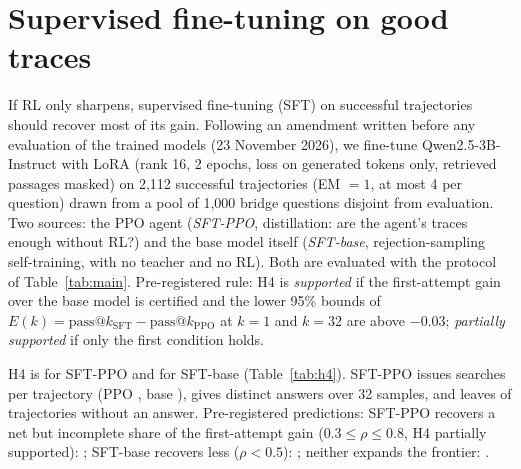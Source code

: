 \documentclass[11pt]{article}
\makeatletter
\newcommand{\passk}{\mathrm{pass@}k}
\makeatother
\begin{document}
\section{Supervised fine-tuning on good traces}\label{sec:h4}

If RL only sharpens, supervised fine-tuning (SFT) on successful trajectories should recover most of its gain. Following an amendment written before any evaluation of the trained models (23 November 2026), we fine-tune Qwen2.5-3B-Instruct with LoRA (rank 16, 2 epochs, loss on generated tokens only, retrieved passages masked) on 2{,}112 successful trajectories (EM $= 1$, at most 4 per question) drawn from a pool of 1{,}000 bridge questions disjoint from evaluation. Two sources: the PPO agent (\emph{SFT-PPO}, distillation: are the agent's traces enough without RL?) and the base model itself (\emph{SFT-base}, rejection-sampling self-training, with no teacher and no RL). Both are evaluated with the protocol of Table~\ref{tab:main}. Pre-registered rule: H4 is \emph{supported} if the first-attempt gain over the base model is certified and the lower 95\% bounds of $E(k) = \passk_\text{SFT} - \passk_\text{PPO}$ at $k = 1$ and $k = 32$ are above $-0.03$; \emph{partially supported} if only the first condition holds.

\begin{table}[t]\centering\small
{}
\caption{SFT on successful traces (500 bridge questions, 32 samples, $T = 4$). $\rho$: share of PPO's first-attempt gain over the base model that is recovered. Brackets: 95\% bootstrap intervals over questions.}\label{tab:h4}
\end{table}

H4 is  for SFT-PPO and  for SFT-base (Table~\ref{tab:h4}). SFT-PPO issues  searches per trajectory (PPO , base ), gives  distinct answers over 32 samples, and leaves  of trajectories without an answer. Pre-registered predictions: SFT-PPO recovers a net but incomplete share of the first-attempt gain ($0.3 \le \rho \le 0.8$, H4 partially supported): ; SFT-base recovers less ($\rho < 0.5$): ; neither expands the frontier: .
\end{document}
